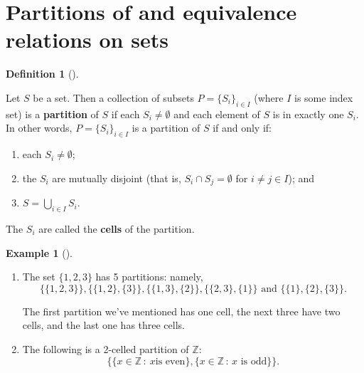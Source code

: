 \documentclass[10pt,]{book}
\newcommand{\terminology}[1]{\textbf{#1}}
\theoremstyle{plain}
\theoremstyle{definition}
\newtheorem{definition}[theorem]{Definition}
\theoremstyle{definition}
\theoremstyle{definition}
\newtheorem{example}[theorem]{Example}
\theoremstyle{definition}
\numberwithin{equation}{section}
\def\Z{\mathbb{Z}}
\begin{document}
\section[{Partitions of and equivalence relations
  on sets}]{Partitions of and equivalence relations
  on sets}\label{section-22}
\begin{definition}[{}]\label{definition-53}

        Let \(S\) be a set. Then a collection of subsets
        \(P=\{S_i\}_{i\in I}\) (where \(I\) is some index set) is a \terminology{partition} of \(S\) if each \(S_i \neq \emptyset\) and each element
        of \(S\) is in exactly one \(S_i\). In other words,
        \(P=\{S_i\}_{i\in I}\) is a partition of \(S\) if and only if:
        \leavevmode%
\begin{enumerate}
\item\hypertarget{li-382}{}
              each \(S_i\neq \emptyset\);
\item\hypertarget{li-383}{}
              the \(S_i\) are mutually disjoint (that is, \(S_i\cap S_j =
              \emptyset\) for \(i\neq j \in I\)); and
\item\hypertarget{li-384}{}
              \(S=\bigcup_{i\in I}S_i\).
\end{enumerate}

\par

        The \(S_i\) are called the \terminology{cells} of the partition.
\end{definition}
\begin{example}[]\label{example-65}
\leavevmode%
\begin{enumerate}
\item\hypertarget{li-385}{}
            The set \(\{1,2,3\}\) has 5 partitions: namely,
\begin{equation*}

              \{\{1,2,3\}\},\{\{1,2\},\{3\}\}, \{\{1,3\},\{2\}\},\{\{2,3\},\{1\}\} \text{ and }  \{\{1\},\{2\},\{3\}\}.
            
\end{equation*}

            The first partition we've mentioned has one cell, the next three have
            two cells, and the last one has three cells.
\item\hypertarget{li-386}{}
            The following is a 2-celled partition of \(\Z\):
\begin{equation*}

              \{\{x\in \Z\,:\ x \text{
              is even} \},\{x\in \Z\,:\, x\text{ is odd} \}\}.
            
\end{equation*}

\end{enumerate}
\end{example}
\end{document}
